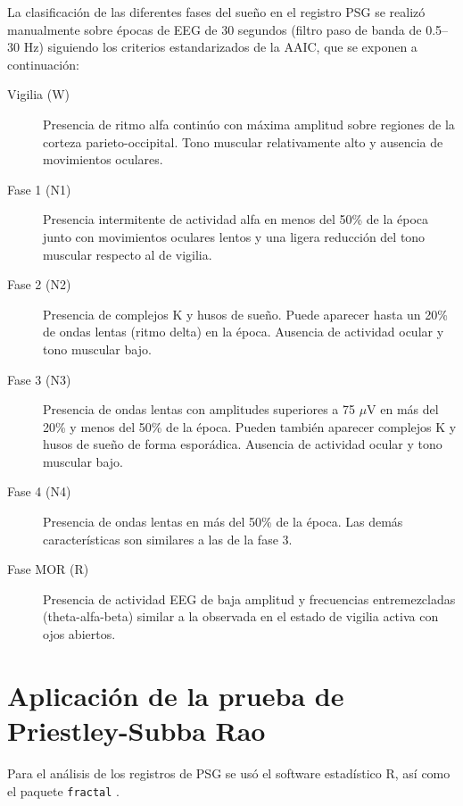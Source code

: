 \documentclass[12pt,a4paper]{mitthesis}
\begin{document}
La clasificaci\'on de las diferentes fases del sue\~no en el registro PSG se realiz\'o manualmente 
sobre \'epocas de EEG de 30 segundos (filtro paso de banda de 0.5--30 Hz) siguiendo los criterios 
estandarizados de la AAIC\cite{Hori01}, que se exponen a continuación:
\begin{description}
\item[Vigilia (W)] Presencia de ritmo alfa contin\'uo con m\'axima amplitud sobre regiones de la 
corteza parieto-occipital. Tono muscular relativamente alto y ausencia de movimientos oculares.

\item[Fase 1 (N1)] Presencia intermitente de actividad alfa en menos del 50\% de la \'epoca junto 
con movimientos oculares lentos y una ligera reducci\'on del tono muscular respecto al de vigilia.

\item[Fase 2 (N2)] Presencia de complejos K y husos de sue\~no. Puede aparecer hasta un 20\% de 
ondas lentas (ritmo delta) en la \'epoca. Ausencia de actividad ocular y tono muscular bajo.

\item[Fase 3 (N3)] Presencia de ondas lentas con amplitudes superiores a 75 $\mu$V en m\'as del 
20\% y menos del 50\% de la \'epoca. Pueden tambi\'en aparecer complejos K y husos de sue\~no de 
forma espor\'adica. Ausencia de actividad ocular y tono muscular bajo.

\item[Fase 4 (N4)] Presencia de ondas lentas en m\'as del 50\% de la época. Las dem\'as 
caracter\'isticas son similares a las de la fase 3.

\item[Fase MOR (R)] Presencia de actividad EEG de baja amplitud y frecuencias entremezcladas 
(theta-alfa-beta) similar a la observada en el estado de vigilia activa con ojos abiertos.
\end{description}


\section{Aplicaci\'on de la prueba de Priestley-Subba Rao}

Para el an\'alisis de los registros de PSG se us\'o el software estad\'istico R\cite{R_citar}, 
as\'i como el paquete \texttt{fractal} \cite{R_fractal}.
\end{document}
